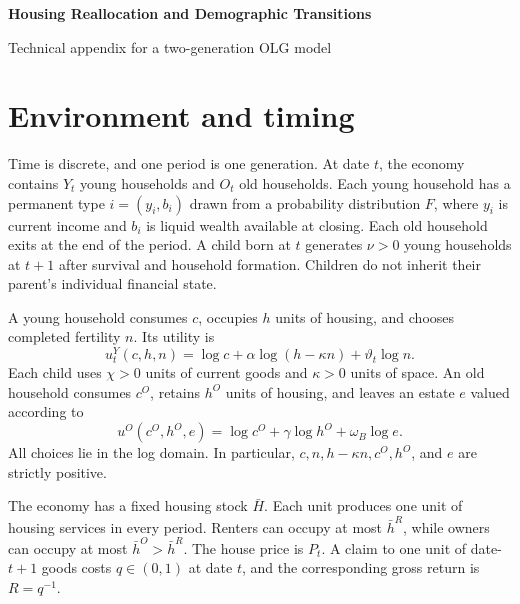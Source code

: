 \documentclass[11pt]{article}
\theoremstyle{definition}
\theoremstyle{remark}
\begin{document}
\begin{center}
{\LARGE\bfseries Housing Reallocation and Demographic Transitions}\par
\vspace{3pt}
{\Large Technical appendix for a two-generation OLG model}\par
\end{center}

\section{Environment and timing}

Time is discrete, and one period is one generation.  At date $t$, the economy
contains $Y_t$ young households and $O_t$ old households.  Each young household
has a permanent type $i=(y_i,b_i)$ drawn from a probability distribution $F$,
where $y_i$ is current income and $b_i$ is liquid wealth available at closing.
Each old household exits at the end of the period.  A child born at $t$
generates $\nu>0$ young households at $t+1$ after survival and household
formation.  Children do not inherit their parent's individual financial state.

A young household consumes $c$, occupies $h$ units of housing, and chooses
completed fertility $n$.  Its utility is
\begin{equation}
 u_t^Y(c,h,n)=\log c+\alpha\log(h-\kappa n)+\vartheta_t\log n.
 \label{eq:young_u_app}
\end{equation}
Each child uses $\chi>0$ units of current goods and $\kappa>0$ units of space.
An old household consumes $c^O$, retains $h^O$ units of housing, and leaves an
estate $e$ valued according to
\begin{equation}
 u^O(c^O,h^O,e)=\log c^O+\gamma\log h^O+\omega_B\log e.
 \label{eq:old_u_app}
\end{equation}
All choices lie in the log domain.  In particular, $c,n,h-\kappa n,c^O,h^O$,
and $e$ are strictly positive.

The economy has a fixed housing stock $\bar H$.  Each unit produces one unit of
housing services in every period.  Renters can occupy at most $\bar h^R$, while
owners can occupy at most $\bar h^O>\bar h^R$.  The house price is $P_t$.  A
claim to one unit of date-$t+1$ goods costs $q\in(0,1)$ at date $t$, and the
corresponding gross return is $R=q^{-1}$.
\end{document}
